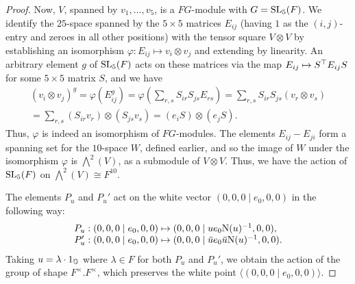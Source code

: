 \begin{proof}
Now, $V$, spanned by $v_1, ..., v_5$, 
is a $FG$-module with $G = \mathrm{SL}_5(F)$. We identify the 
$25$-space spanned by the $5 \times 5$ matrices
$E_{i j}$ (having $1$ as the $(i,j)$-entry and zeroes in all
other positions) with the tensor square $V \otimes V$ by
establishing an isomorphism 
$\varphi: E_{i j} \mapsto v_i \otimes v_j$
and extending by linearity. An arbitrary element $g$ of 
$\mathrm{SL}_5(F)$ acts on these matrices via the map 
$E_{i j} \mapsto S^{\top} E_{i j} S$ 
for some $5 \times 5$ matrix $S$,
and we have 
\begin{multline*}
	(v_i \otimes v_j)^g = \varphi(E_{i j}^g) = 
		\varphi\left(\sum_{r,s} S_{i r} S_{j s} E_{r s}\right) 
	= \sum_{r,s} S_{i r} S_{j s} (v_r \otimes v_s) \\ =
	\sum_{r,s} (S_{i r} v_r) \otimes (S_{j s} v_s) = 
	(e_i S) \otimes (e_j S).
\end{multline*}
Thus, $\varphi$ is indeed an isomorphism of $FG$-modules. 
The elements $E_{i j} - E_{j i}$ form a spanning set for the
$10$-space $W$, defined earlier, and so the image of 
$W$ under the isomorphism $\varphi$ is $\bigwedge^2 (V)$,
as a submodule of $V \otimes V$. Thus, we have
	the action of $\mathrm{SL}_5(F)$ on $\bigwedge^2(V) \cong F^{10}$.
	
The elements $P_u$ and $P_u'$ act on the white vector $(0,0,0 \mid e_0,0,0)$ in the following way:
\begin{equation*}
	\begin{array}{r@{\;}c@{\;}l}
		P_u : (0,0,0 \mid e_0, 0,0) & \mapsto & (0,0,0 \mid u e_0 \NN(u)^{-1}, 0,0), \\
		P_u' : (0,0,0 \mid e_0,0,0) & \mapsto & (0,0,0 \mid \ovu e_0 \ovu \NN(u)^{-1}, 0,0).
	\end{array}
\end{equation*}
Taking $u = \lambda \cdot 1_{\mathbb{O}}$ where $\lambda \in F$ for both $P_u$ and $P_u'$, we obtain the action
of the group of shape $F^{\times}.F^{\times}$, which preserves the white point $\langle (0,0,0 \mid e_0,0,0) \rangle$.


\end{proof}
